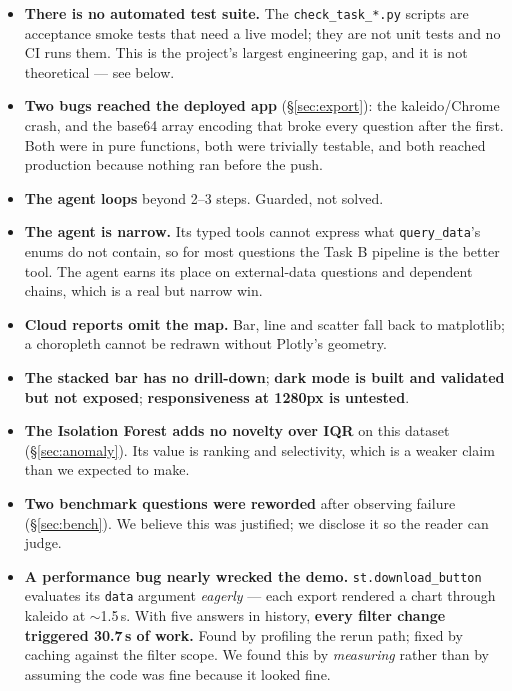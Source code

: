 \documentclass[11pt,a4paper]{article}
\begin{document}
\begin{itemize}[leftmargin=*]
\item \textbf{There is no automated test suite.} The \texttt{check\_task\_*.py} scripts
      are acceptance smoke tests that need a live model; they are not unit tests and no
      CI runs them. This is the project's largest engineering gap, and it is not
      theoretical --- see below.
\item \textbf{Two bugs reached the deployed app} (\S\ref{sec:export}): the kaleido/Chrome
      crash, and the base64 array encoding that broke every question after the first.
      Both were in pure functions, both were trivially testable, and both reached
      production because nothing ran before the push.
\item \textbf{The agent loops} beyond 2--3 steps. Guarded, not solved.
\item \textbf{The agent is narrow.} Its typed tools cannot express what
      \texttt{query\_data}'s enums do not contain, so for most questions the Task B
      pipeline is the better tool. The agent earns its place on external-data questions
      and dependent chains, which is a real but narrow win.
\item \textbf{Cloud reports omit the map.} Bar, line and scatter fall back to
      matplotlib; a choropleth cannot be redrawn without Plotly's geometry.
\item \textbf{The stacked bar has no drill-down}; \textbf{dark mode is built and
      validated but not exposed}; \textbf{responsiveness at 1280px is untested}.
\item \textbf{The Isolation Forest adds no novelty over IQR} on this dataset
      (\S\ref{sec:anomaly}). Its value is ranking and selectivity, which is a weaker
      claim than we expected to make.
\item \textbf{Two benchmark questions were reworded} after observing failure
      (\S\ref{sec:bench}). We believe this was justified; we disclose it so the reader
      can judge.
\item \textbf{A performance bug nearly wrecked the demo.} \texttt{st.download\_button}
      evaluates its \texttt{data} argument \emph{eagerly} --- each export rendered a
      chart through kaleido at $\sim$1.5\,s. With five answers in history, \textbf{every
      filter change triggered 30.7\,s of work.} Found by profiling the rerun path; fixed
      by caching against the filter scope. We found this by \emph{measuring} rather than
      by assuming the code was fine because it looked fine.
\end{itemize}
\end{document}
